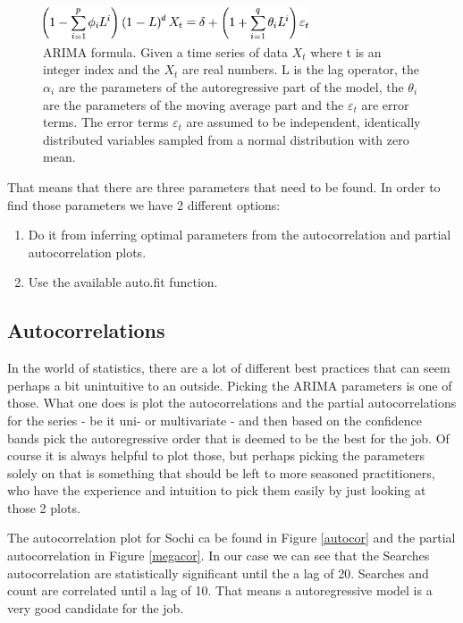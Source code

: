 \documentclass[minf,twoside,singlespacing,parskip,frontabs,notimes,12pt]{infthesis} %
\begin{document}
\begin{figure}[h!]
\begin{center}
\includegraphics[width=0.7\textwidth]{ARIMA}
\end{center}
\caption{ARIMA formula. Given a time series of data $X_t$ where t is an integer index and the $X_t$ are real numbers. L is the lag operator, the $\alpha_i$ are the parameters of the autoregressive part of the model, the $\theta_i$ are the parameters of the moving average part and the $\varepsilon_t$ are error terms. The error terms $\varepsilon_t$ are assumed to be independent, identically distributed variables sampled from a normal distribution with zero mean.
}
\label{arima}
\end{figure}

That means that there are three parameters that need to be found. In order to find those parameters we have 2 different options:
\begin{enumerate}
\item Do it from inferring optimal parameters from the autocorrelation and partial autocorrelation plots.
\item Use the available auto.fit function.
\end{enumerate}

\subsection{Autocorrelations}

In the world of statistics, there are a lot of different best practices that can seem perhaps a bit unintuitive to an outside. Picking the ARIMA parameters is one of those. What one does is plot the autocorrelations and the partial autocorrelations for the series - be it uni- or multivariate - and then based on the confidence bands pick the autoregressive order that is deemed to be the best for the job. Of course it is always helpful to plot those, but perhaps picking the parameters solely on that is something that should be left to more seasoned practitioners, who have the experience and intuition to pick them easily by just looking at those 2 plots. 


The autocorrelation plot for Sochi ca be found in Figure \ref{autocor}  and the partial autocorrelation in Figure \ref{megacor}. In our case we can see that the Searches autocorrelation are statistically significant until the a lag of 20. Searches and count are correlated until a lag of 10. That means a autoregressive model is a very good candidate for the job. 
\end{document}

